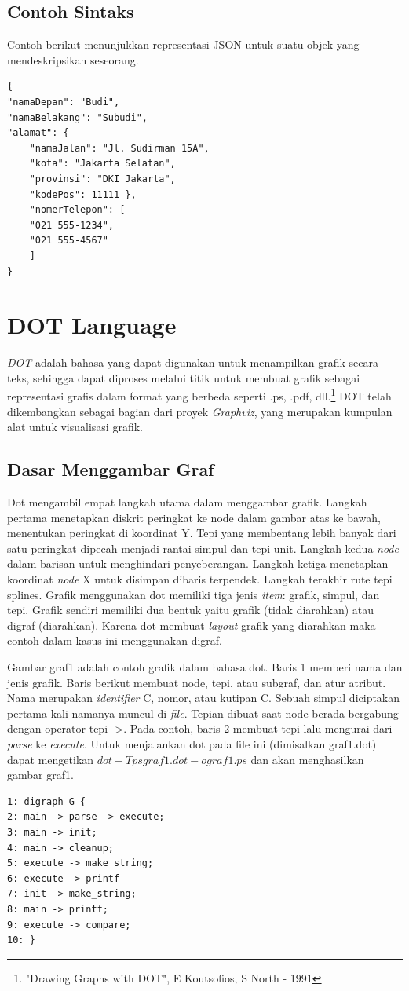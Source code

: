 \subsection{Contoh Sintaks}
\label{sec: Contoh Sintaks}
Contoh berikut menunjukkan representasi JSON untuk suatu objek yang mendeskripsikan seseorang.
\begin{lstlisting}
{ 
"namaDepan": "Budi", 
"namaBelakang": "Subudi", 
"alamat": { 
	"namaJalan": "Jl. Sudirman 15A", 
	"kota": "Jakarta Selatan", 
	"provinsi": "DKI Jakarta", 
	"kodePos": 11111 }, 
	"nomerTelepon": [ 
	"021 555-1234", 
	"021 555-4567" 
	] 
}
\end{lstlisting}




\section{DOT Language}
\label{sec: DOT Language}
\textit{DOT} adalah bahasa yang dapat digunakan untuk menampilkan grafik secara teks, sehingga dapat diproses melalui titik untuk membuat grafik sebagai representasi grafis dalam format yang berbeda seperti .ps, .pdf, dll.\footnote{"Drawing Graphs with DOT", E Koutsofios, S North - 1991} DOT telah dikembangkan sebagai bagian dari proyek \textit{Graphviz}, yang merupakan kumpulan alat untuk visualisasi grafik. 

\subsection{Dasar Menggambar Graf}
\label{sec: Dasar Menggambar Graf}
Dot mengambil empat langkah utama dalam menggambar grafik. Langkah pertama menetapkan diskrit peringkat ke node dalam gambar atas ke bawah, menentukan peringkat di koordinat Y. Tepi yang membentang lebih banyak dari satu peringkat dipecah menjadi rantai simpul dan tepi unit. Langkah kedua \textit{node} dalam barisan untuk menghindari penyeberangan. Langkah ketiga menetapkan koordinat \textit{node} X untuk disimpan dibaris terpendek. Langkah terakhir rute tepi splines. Grafik menggunakan dot memiliki tiga jenis \textit{item}: grafik, simpul, dan tepi. Grafik sendiri memiliki dua bentuk yaitu grafik (tidak diarahkan) atau digraf (diarahkan). Karena dot membuat \textit{layout} grafik yang diarahkan maka contoh dalam kasus ini menggunakan digraf. 

Gambar graf1 adalah contoh grafik dalam bahasa dot. Baris 1 memberi nama dan jenis grafik. Baris berikut membuat node, tepi, atau subgraf, dan atur atribut. Nama merupakan \textit{identifier} C, nomor, atau kutipan C. Sebuah simpul diciptakan pertama kali namanya muncul di \textit{file}. Tepian dibuat saat node berada bergabung dengan operator tepi ->. Pada contoh, baris 2 membuat tepi lalu mengurai dari \textit{parse} ke \textit{execute}. Untuk menjalankan dot pada file ini (dimisalkan graf1.dot) dapat mengetikan $ dot -Tps graf1.dot -o graf1.ps $ dan akan menghasilkan gambar graf1. 
\begin{lstlisting}
1: digraph G {
2: main -> parse -> execute;
3: main -> init;
4: main -> cleanup;
5: execute -> make_string;
6: execute -> printf
7: init -> make_string;
8: main -> printf;
9: execute -> compare;
10: }
\end{lstlisting}

